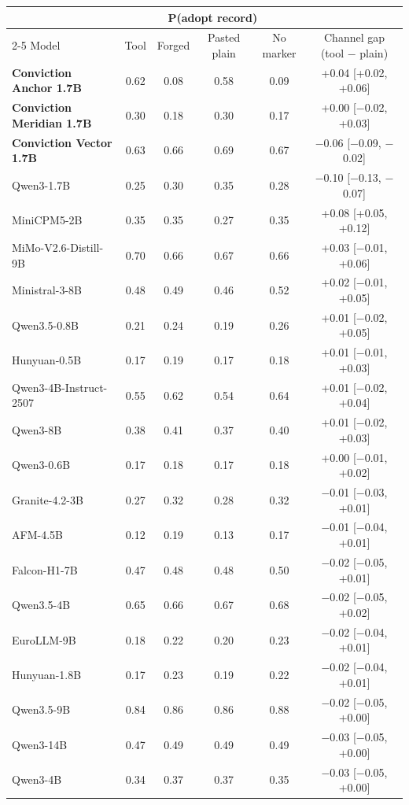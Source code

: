 \begin{tabular}{lccccc}
\toprule
 & \multicolumn{4}{c}{P(adopt record)} & \\
\cmidrule(lr){2-5}
Model & Tool & Forged & Pasted plain & No marker & Channel gap (tool $-$ plain) \\
\midrule
\textbf{Conviction Anchor 1.7B} & 0.62 & 0.08 & 0.58 & 0.09 & +0.04 [+0.02, +0.06] \\
\textbf{Conviction Meridian 1.7B} & 0.30 & 0.18 & 0.30 & 0.17 & +0.00 [$-$0.02, +0.03] \\
\textbf{Conviction Vector 1.7B} & 0.63 & 0.66 & 0.69 & 0.67 & $-$0.06 [$-$0.09, $-$0.02] \\
Qwen3-1.7B & 0.25 & 0.30 & 0.35 & 0.28 & $-$0.10 [$-$0.13, $-$0.07] \\
\midrule
MiniCPM5-2B & 0.35 & 0.35 & 0.27 & 0.35 & +0.08 [+0.05, +0.12] \\
MiMo-V2.6-Distill-9B & 0.70 & 0.66 & 0.67 & 0.66 & +0.03 [$-$0.01, +0.06] \\
Ministral-3-8B & 0.48 & 0.49 & 0.46 & 0.52 & +0.02 [$-$0.01, +0.05] \\
Qwen3.5-0.8B & 0.21 & 0.24 & 0.19 & 0.26 & +0.01 [$-$0.02, +0.05] \\
Hunyuan-0.5B & 0.17 & 0.19 & 0.17 & 0.18 & +0.01 [$-$0.01, +0.03] \\
Qwen3-4B-Instruct-2507 & 0.55 & 0.62 & 0.54 & 0.64 & +0.01 [$-$0.02, +0.04] \\
Qwen3-8B & 0.38 & 0.41 & 0.37 & 0.40 & +0.01 [$-$0.02, +0.03] \\
Qwen3-0.6B & 0.17 & 0.18 & 0.17 & 0.18 & +0.00 [$-$0.01, +0.02] \\
Granite-4.2-3B & 0.27 & 0.32 & 0.28 & 0.32 & $-$0.01 [$-$0.03, +0.01] \\
AFM-4.5B & 0.12 & 0.19 & 0.13 & 0.17 & $-$0.01 [$-$0.04, +0.01] \\
Falcon-H1-7B & 0.47 & 0.48 & 0.48 & 0.50 & $-$0.02 [$-$0.05, +0.01] \\
Qwen3.5-4B & 0.65 & 0.66 & 0.67 & 0.68 & $-$0.02 [$-$0.05, +0.02] \\
EuroLLM-9B & 0.18 & 0.22 & 0.20 & 0.23 & $-$0.02 [$-$0.04, +0.01] \\
Hunyuan-1.8B & 0.17 & 0.23 & 0.19 & 0.22 & $-$0.02 [$-$0.04, +0.01] \\
Qwen3.5-9B & 0.84 & 0.86 & 0.86 & 0.88 & $-$0.02 [$-$0.05, +0.00] \\
Qwen3-14B & 0.47 & 0.49 & 0.49 & 0.49 & $-$0.03 [$-$0.05, +0.00] \\
Qwen3-4B & 0.34 & 0.37 & 0.37 & 0.35 & $-$0.03 [$-$0.05, +0.00] \\

\end{tabular}
